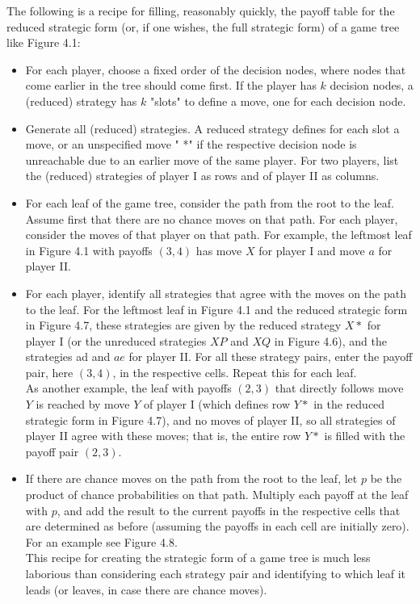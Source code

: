 \documentclass[12pt]{article}
\begin{document}
The following is a recipe for filling, reasonably quickly, the payoff table for the reduced strategic form (or, if one wishes, the full strategic form) of a game tree like Figure 4.1:

\begin{itemize}
  \item For each player, choose a fixed order of the decision nodes, where nodes that come earlier in the tree should come first. If the player has $k$ decision nodes, a (reduced) strategy has $k$ "slots" to define a move, one for each decision node.
  \item Generate all (reduced) strategies. A reduced strategy defines for each slot a move, or an unspecified move " *" if the respective decision node is unreachable due to an earlier move of the same player. For two players, list the (reduced) strategies of player I as rows and of player II as columns.
  \item For each leaf of the game tree, consider the path from the root to the leaf. Assume first that there are no chance moves on that path. For each player, consider the moves of that player on that path. For example, the leftmost leaf in Figure 4.1 with payoffs $(3,4)$ has move $X$ for player I and move $a$ for player II.
  \item For each player, identify all strategies that agree with the moves on the path to the leaf. For the leftmost leaf in Figure 4.1 and the reduced strategic form in Figure 4.7, these strategies are given by the reduced strategy $X *$ for player I (or the unreduced strategies $X P$ and $X Q$ in Figure 4.6), and the strategies ad and $a e$ for player II. For all these strategy pairs, enter the payoff pair, here $(3,4)$, in the respective cells. Repeat this for each leaf.\\
As another example, the leaf with payoffs $(2,3)$ that directly follows move $Y$ is reached by move $Y$ of player I (which defines row $Y *$ in the reduced strategic form in Figure 4.7), and no moves of player II, so all strategies of player II agree with these moves; that is, the entire row $Y *$ is filled with the payoff pair $(2,3)$.
  \item If there are chance moves on the path from the root to the leaf, let $p$ be the product of chance probabilities on that path. Multiply each payoff at the leaf with $p$, and add the result to the current payoffs in the respective cells that are determined as before (assuming the payoffs in each cell are initially zero). For an example see Figure 4.8.\\
This recipe for creating the strategic form of a game tree is much less laborious than considering each strategy pair and identifying to which leaf it leads (or leaves, in case there are chance moves).
\end{itemize}
\end{document}
